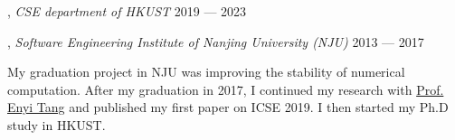 
, \textit{CSE department of HKUST}	\hfill 2019 --- 2023

, \textit{Software Engineering Institute of Nanjing University (NJU)} \hfill    2013 --- 2017

My graduation project in NJU was improving the stability of numerical computation.
After my graduation in 2017, I continued my research with \href{https://software.nju.edu.cn/eytang/}{Prof. Enyi Tang}
and published my first paper on ICSE 2019. I then started my Ph.D study in HKUST.



